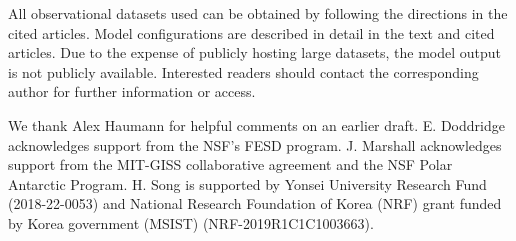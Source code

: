 \documentclass{ametsocV5}
\begin{document}


%
\datastatement
All observational datasets used can be obtained by following the directions in the cited articles. Model configurations are described in detail in the text and cited articles. Due to the expense of publicly hosting large datasets, the model output is not publicly available. Interested readers should contact the corresponding author for further information or access.

%
\acknowledgments
We thank Alex Haumann for helpful comments on an earlier draft. E. Doddridge acknowledges support from the NSF's FESD program. J. Marshall acknowledges support from the MIT-GISS collaborative agreement and the NSF Polar Antarctic Program. H. Song is supported by Yonsei University Research Fund (2018-22-0053) and National Research Foundation of Korea (NRF) grant funded by Korea government (MSIST) (NRF-2019R1C1C1003663).


%



\end{document}
